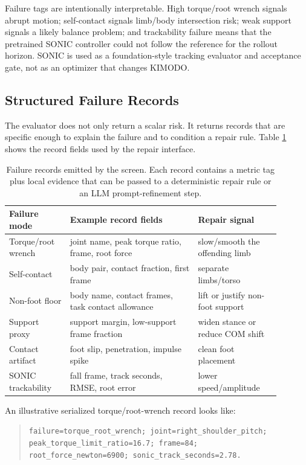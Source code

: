 \documentclass[10pt]{article}
\begin{document}
Failure tags are intentionally interpretable. High torque/root wrench signals
abrupt motion; self-contact signals limb/body intersection risk; weak support
signals a likely balance problem; and trackability failure means that the
pretrained SONIC controller could not follow the reference for the rollout
horizon. SONIC is used as a foundation-style tracking evaluator and acceptance
gate, not as an optimizer that changes KIMODO.

\subsection{Structured Failure Records}

The evaluator does not only return a scalar risk. It returns records that are
specific enough to explain the failure and to condition a repair rule. Table
\ref{tab:records} shows the record fields used by the repair interface.

\begin{table}[h]
\centering
\caption{Failure records emitted by the screen. Each record contains a metric
tag plus local evidence that can be passed to a deterministic repair rule or an
LLM prompt-refinement step.}
\label{tab:records}
\small
\begin{tabular}{p{0.20\linewidth}p{0.42\linewidth}p{0.27\linewidth}}
\toprule
Failure mode & Example record fields & Repair signal \\
\midrule
Torque/root wrench & joint name, peak torque ratio, frame, root force & slow/smooth the offending limb \\
Self-contact & body pair, contact fraction, first frame & separate limbs/torso \\
Non-foot floor & body name, contact frames, task contact allowance & lift or justify non-foot support \\
Support proxy & support margin, low-support frame fraction & widen stance or reduce COM shift \\
Contact artifact & foot slip, penetration, impulse spike & clean foot placement \\
SONIC trackability & fall frame, track seconds, RMSE, root error & lower speed/amplitude \\
\bottomrule
\end{tabular}
\end{table}

An illustrative serialized torque/root-wrench record looks like:

\begin{quote}\small
\texttt{failure=torque\_root\_wrench; joint=right\_shoulder\_pitch;}\\
\texttt{peak\_torque\_limit\_ratio=16.7; frame=84;}\\
\texttt{root\_force\_newton=6900; sonic\_track\_seconds=2.78.}
\end{quote}
\end{document}
